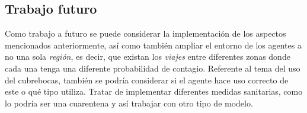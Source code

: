 \documentclass[final,6p,times,twocolumn]{elsarticle}
\begin{document}
\subsection{Trabajo futuro}
Como trabajo a futuro se puede considerar la implementación de los aspectos mencionados anteriormente, así como también ampliar el entorno de los agentes a no una sola \textit{región}, es decir, que existan los \textit{viajes} entre diferentes zonas donde cada una tenga una diferente probabilidad de contagio. Referente al tema del uso del cubrebocas, también se podría considerar si el agente hace uso correcto de este o qué tipo utiliza. 
Tratar de implementar diferentes medidas sanitarias, como lo podría ser una cuarentena y así trabajar con otro tipo de modelo.


\end{document}
